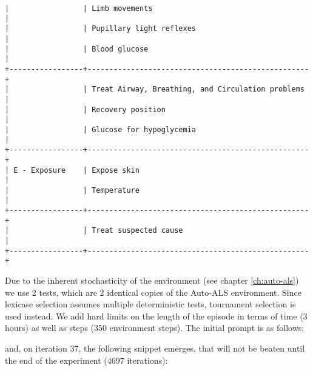 \begin{lstlisting}
|                 | Limb movements                                    |
|                 | Pupillary light reflexes                          |
|                 | Blood glucose                                     |
+-----------------+---------------------------------------------------+
|                 | Treat Airway, Breathing, and Circulation problems |
|                 | Recovery position                                 |
|                 | Glucose for hypoglycemia                          |
+-----------------+---------------------------------------------------+
| E - Exposure    | Expose skin                                       |
|                 | Temperature                                       |
+-----------------+---------------------------------------------------+
|                 | Treat suspected cause                             |
+-----------------+---------------------------------------------------+
\end{lstlisting}

Due to the inherent stochasticity of the environment (see chapter \ref{ch:auto-als}) we use 2 tests, which are 2 identical copies of the Auto-ALS environment.
Since lexicase selection assumes multiple deterministic tests, tournament selection is used instead.
We add hard limits on the length of the episode in terms of time (3 hours) as well as steps (350 environment steps).
The initial prompt is as follows:



and, on iteration 37, the following snippet emerges, that will not be beaten until the end of the experiment (4697 iterations):


